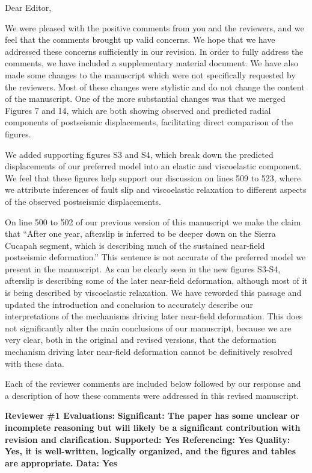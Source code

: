 \documentclass[10pt,a4paper]{letter}
\begin{document}
\signature{Trever T. Hines}

\begin{letter}{}
\opening{Dear Editor,}

We were pleased with the positive comments from you and the reviewers, and we feel that the comments brought up valid concerns. We hope that we have addressed these concerns sufficiently in our revision. In order to fully address the comments, we have included a supplementary material document.  We have also made some changes to the manuscript which were not specifically requested by the reviewers.  Most of these changes were stylistic and do not change the content of the manuscript.  One of the more substantial changes was that we merged Figures 7 and 14, which are both showing observed and predicted radial components of postseismic displacements, facilitating direct comparison of the figures. 

We added supporting figures S3 and S4, which break down the predicted displacements of our preferred model into an elastic and viscoelastic component.  We feel that these figures help support our discussion on lines 509 to 523, where we attribute inferences of fault slip and viscoelastic relaxation to different aspects of the observed postseismic displacements.  

On line 500 to 502 of our previous version of this manuscript we make the claim that “After one year, afterslip is inferred to be deeper down on the Sierra Cucapah segment, which is describing much of the sustained near-field postseismic deformation.”  This sentence is not accurate of the preferred model we present in the manuscript. As can be clearly seen in the new figures S3-S4, afterslip is describing some of the later near-field deformation, although most of it is being described by viscoelastic relaxation.  We have reworded this passage and updated the introduction and conclusion to accurately describe our interpretations of the mechanisms driving later near-field deformation.  This does not significantly alter the main conclusions of our manuscript, because we are very clear, both in the original and revised versions, that the deformation mechanism driving later near-field deformation cannot be definitively resolved with these data.        

Each of the reviewer comments are included below followed by our response and a description of how these comments were addressed in this revised manuscript.

\textbf{Reviewer \#1 Evaluations:}\newline
\textbf{Significant: The paper has some unclear or incomplete reasoning but will likely be a significant contribution with revision and clarification.}\newline
\textbf{Supported: Yes}\newline
\textbf{Referencing: Yes}\newline
\textbf{Quality: Yes, it is well-written, logically organized, and the figures and tables are appropriate.}\newline
\textbf{Data: Yes}


\end{letter}
\end{document}
